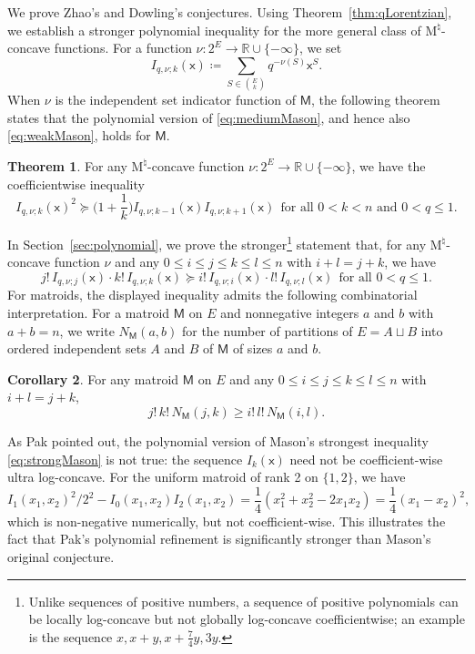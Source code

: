 \documentclass{amsart}
\theoremstyle{definition}
\newtheorem{theorem}{Theorem}[section]
\newtheorem{corollary}[theorem]{Corollary}
\theoremstyle{remark}
\newcommand{\M}{\mathsf{M}}    %
\newcommand{\x}{\mathsf{x}}    %
\newcommand{\1}{\mathbf{1}}
\newcommand{\Mnat}{$\text{M}^\natural$}
\numberwithin{equation}{section}
\begin{document}
 We prove Zhao's and Dowling's conjectures.
Using Theorem~\ref{thm:qLorentzian}, 
we establish a stronger polynomial inequality for the more general class of \Mnat-concave functions.
For a function $\nu:2^E \to \mathbb{R} \cup \{-\infty\}$, we set
\[
I_{q,\nu;k}(\x)\coloneqq \sum_{S\in\binom{E}{k}}q^{-\nu(S)}\x^S. 
\]
When $\nu$ is the independent set indicator function of $\M$,  the following theorem states that the polynomial version of \eqref{eq:mediumMason}, and hence also \eqref{eq:weakMason}, holds for $\M$. %

\begin{theorem}\label{thm:qpolynomial}
For any \Mnat-concave function $\nu:2^E \to \mathbb{R} \cup \{-\infty\}$, we have the coefficientwise inequality
  \[
  I_{q,\nu;k}(\x)^2 \succeq \Big(1+\frac1k\Big)I_{q,\nu;k-1}(\x) I_{q,\nu;k+1}(\x)
   \ \ \text{for  all $0<k<n$ and $0<q\leq 1$.}
  \]
\end{theorem}


In Section~\ref{sec:polynomial}, we prove the stronger\footnote{Unlike sequences of positive numbers, a sequence of positive polynomials can be locally log-concave but not globally log-concave coefficientwise; an example is the sequence $x, x+y, x+\frac74y, 3y$.}
statement that, for any \Mnat-concave function $\nu$ and any $0\leq i \leq j \leq k \leq l \leq n$ with $i+l=j+k$, we have 
 \[
   j! \, I_{q,\nu;j}(\x) \cdot k! \, I_{q,\nu;k}(\x) \succeq i! \, I_{q,\nu;i}(\x) \cdot  l! \, I_{q,\nu;l}(\x) \ \ \text{for all $0<q\leq 1$}.
  \]
For matroids, the displayed inequality admits the following combinatorial interpretation.
For a matroid $\M$ on $E$ and nonnegative integers $a$ and $b$ with $a+b=n$, we write $N_\M(a,b)$ for the number of partitions of $E =A \sqcup B$ into ordered independent sets $A$ and $B$ of $\M$ of sizes $a$ and $b$.

\begin{corollary}\label{cor:partition}
For any matroid $\M$ on $E$ and any  $0\leq i \leq j \leq k \leq l \leq n$ with $i+l=j+k$, 
\[
j! \, k! \, N_\M(j,k) \ge i! \, l! \, N_\M(i,l).
\]
\end{corollary}

As Pak pointed out, the polynomial version of Mason's strongest inequality \eqref{eq:strongMason} is not true: the sequence $I_k(\x)$ need not be  coefficient-wise ultra log-concave. For the uniform matroid of rank 2 on $\{1,2\}$, we have
\[
I_1(x_1,x_2)^2/2^2-I_0(x_1,x_2)I_2(x_1,x_2)=\frac{1}{4}(x_1^2+x_2^2-2x_1x_2)=\frac{1}{4}(x_1-x_2)^2,
\]
which is non-negative numerically, but not coefficient-wise. 
This illustrates the fact that Pak's polynomial refinement is significantly stronger than Mason's original conjecture.
\end{document}

